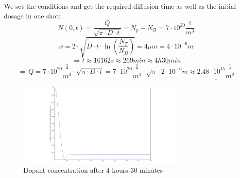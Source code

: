 We set the conditions and get the required diffusion time as well as the initial dosage in one shot:
\begin{equation}
N(0,t)
=
\frac{Q}{\sqrt{\pi\cdot D \cdot t}}
=
N_p-N_B
=
7 \cdot 10^{20} \frac{1}{m^3}
\end{equation}
\begin{equation}
x
=
2 \cdot \sqrt{D \cdot t \cdot\ln\left(\frac{N_T}{N_B}\right)}
=
4 \mu m
=
4 \cdot 10^{-6} m
\end{equation}
\begin{equation}
\Rightarrow
t
\approx
16162s
\approx
269min
\approx
\underline{4h 30 min}
\end{equation}
\begin{equation}
\Rightarrow
Q
=
7 \cdot 10^{20} \frac{1}{m^3} \cdot \sqrt{\pi\cdot D \cdot t}
=
7 \cdot 10^{20} \frac{1}{m^3} \cdot \sqrt{\pi} \cdot 2 \cdot 10^{-6} m
\approx
\underline{2.48 \cdot 10^{15} \frac{1}{m^2}}
\end{equation}

\begin{figure}[H]
	\centering
	\includegraphics[width=0.75\textwidth]{n-well-diffusion.png}
	\caption{Dopant concentration after 4 hours 30 minutes}
	\label{nwell_drive_in_outcome}
\end{figure}